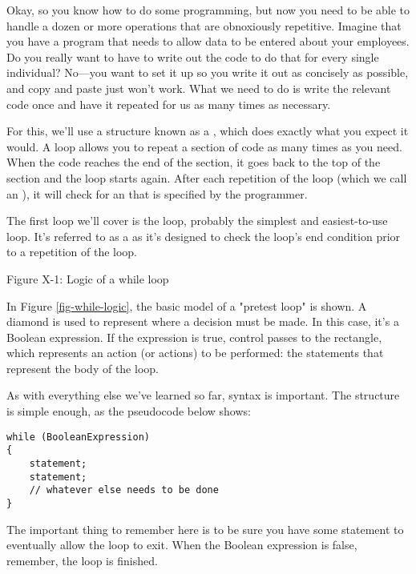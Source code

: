 
Okay, so you know how to do some programming, but now you need to be able to handle a dozen or more operations that are obnoxiously repetitive.
Imagine that you have a program that needs to allow data to be entered about your employees.
Do you really want to have to write out the code to do that for every single individual?
No---you want to set it up so you write it out as concisely as possible, and copy and paste just won't work.
What we need to do is write the relevant code once and have it repeated for us as many times as necessary.

For this, we'll use a structure known as a , which does exactly what you expect it would.
A loop allows you to repeat a section of code as many times as you need.
When the code reaches the end of the section, it goes back to the top of the section and the loop starts again.
After each repetition of the loop (which we call an ), it will check for an  that is specified by the programmer. 


The first loop we'll cover is the  loop, probably the simplest and easiest-to-use loop.
It's referred to as a  as it's designed to check the loop's end condition prior to a repetition of the loop.

Figure X-1: Logic of a while loop
\label{fig-while-logic}

In Figure \ref{fig-while-logic}, the basic model of a "pretest loop" is shown.
A diamond is used to represent where a decision must be made.
In this case, it's a Boolean expression.
If the expression is true, control passes to the rectangle, which represents an action (or actions) to be performed: the statements that represent the body of the loop.

As with everything else we've learned so far, syntax is important. The structure is simple enough, as the pseudocode below shows:

\begin{lstlisting}
while (BooleanExpression)
{
	statement;
	statement;
	// whatever else needs to be done
}
\end{lstlisting}

The important thing to remember here is to be sure you have some statement to eventually allow the loop to exit.
When the Boolean expression is false, remember, the loop is finished.

